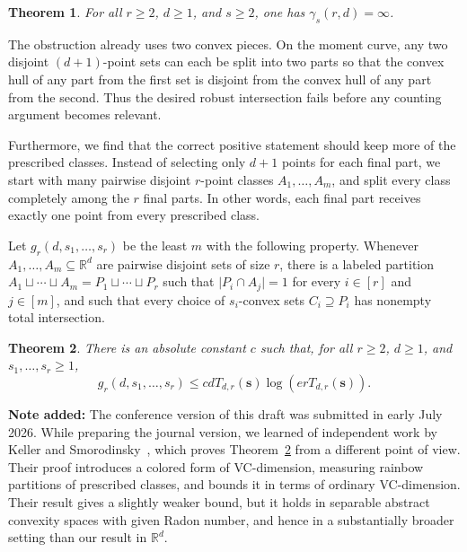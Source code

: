 \documentclass[11pt]{article}
\newtheorem{theorem}{Theorem}[section]
\theoremstyle{definition}
\newcommand*{\abs}[1]{\lvert#1\rvert}
\newcommand{\R}{\mathbb{R}}
\begin{document}
\begin{theorem}\label{thm:rainbow-obstruction}
For all \(r\ge2\), \(d\ge1\), and \(s\ge2\), one has \(\gamma_{s}(r,d)=\infty\).
\end{theorem}

The obstruction already uses two convex pieces. On the moment curve, any two disjoint \((d+1)\)-point sets can each be split into two parts so that the convex hull of any part from the first set is disjoint from the convex hull of any part from the second. Thus the desired robust intersection fails before any counting argument becomes relevant.

Furthermore, we find that the correct positive statement should keep more of the prescribed classes. Instead of selecting only \(d+1\) points for each final part, we start with many pairwise disjoint \(r\)-point classes \(A_{1},\ldots,A_{m}\), and split every class completely among the \(r\) final parts. In other words, each final part receives exactly one point from every prescribed class.

Let \(g_{r}(d,s_{1},\ldots,s_{r})\) be the least \(m\) with the following property. Whenever \(A_{1},\ldots,A_{m}\subseteq\R^{d}\) are pairwise disjoint sets of size \(r\), there is a labeled partition \(A_{1}\sqcup\cdots\sqcup A_{m}=P_{1}\sqcup\cdots\sqcup P_{r}\) such that \(\abs{P_{i}\cap A_{j}}=1\) for every \(i\in [r]\) and \(j\in [m]\), and such that every choice of \(s_{i}\)-convex sets \(C_{i}\supseteq P_{i}\) has nonempty total intersection.

\begin{theorem}\label{thm:block}
There is an absolute constant \(c\) such that, for all \(r\ge 2\), \(d\ge 1\), and \(s_{1},\ldots,s_{r}\ge 1\),
\[
g_{r}(d,s_{1},\ldots,s_{r})\le cdT_{d,r}(\boldsymbol{s})\log(erT_{d,r}(\boldsymbol{s})).
\]
\end{theorem}
\medskip
\noindent\textbf{Note added:} The conference version of this draft was submitted in early July 2026. While preparing the journal version, we learned of independent work by Keller and Smorodinsky~\cite{2026coloredVC}, which proves Theorem~\ref{thm:block} from a different point of view. Their proof introduces a colored form of VC-dimension, measuring rainbow partitions of prescribed classes, and bounds it in terms of ordinary VC-dimension. Their result gives a slightly weaker bound, but it holds in separable abstract convexity spaces with given Radon number, and hence in a substantially broader setting than our result in \(\R^{d}\).
\end{document}
